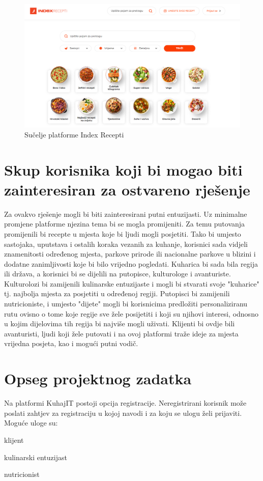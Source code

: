 		\begin{figure}[H]
			\includegraphics[scale=0.4]{slike/indexRecepti.PNG} %
			\centering
			\caption{Sučelje platforme Index Recepti}
			\label{indexRecepti}
		\end{figure}
		
		\section{Skup korisnika koji bi mogao biti zainteresiran za ostvareno rješenje}
		
		Za ovakvo rješenje mogli bi biti zainteresirani putni entuzijasti. Uz minimalne promjene platforme njezina tema bi se mogla promijeniti. Za temu putovanja promijenili bi recepte u mjesta koje bi ljudi mogli posjetiti. Tako bi umjesto sastojaka, uputstava i ostalih koraka vezanih za kuhanje, korisnici sada vidjeli znamenitosti određenog mjesta, parkove prirode ili nacionalne parkove u blizini i dodatne zanimljivosti koje bi bilo vrijedno pogledati. Kuharica bi sada bila regija ili država, a korisnici bi se dijelili na putopisce, kulturologe i avanturiste. Kulturolozi bi zamijenili kulinarske entuzijaste i mogli bi stvarati svoje "kuharice" tj. najbolja mjesta za posjetiti u određenoj regiji. Putopisci bi zamijenili nutricioniste, i umjesto "dijete" mogli bi korisnicima predložiti personaliziranu rutu ovisno o tome koje regije sve žele posijetiti i koji su njihovi interesi, odnosno u kojim dijelovima tih regija bi najviše mogli uživati. Klijenti bi ovdje bili avanturisti, ljudi koji žele putovati i na ovoj platformi traže ideje za mjesta vrijedna posjeta, kao i mogući putni vodič.
		
		\section{Opseg projektnog zadatka}
		Na platformi KuhajIT postoji opcija registracije.
		Neregistrirani korisnik može poslati zahtjev za registraciju u kojoj navodi i za koju se ulogu želi prijaviti. Moguće uloge su:
		\begin{packed_item}
		    \item klijent
		    \item kulinarski entuzijast
		    \item nutricionist
		\end{packed_item}
		

